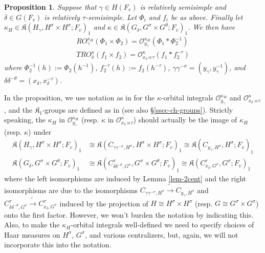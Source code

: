 \documentclass[12pt]{amsart}
\newtheorem{prop}[thm]{Proposition}
\theoremstyle{remark}
\numberwithin{equation}{section}
\newcommand{\OO}{\mathcal{O}}
\theoremstyle{definition}
\numberwithin{equation}{subsection}
\begin{document}
\begin{prop} \label{prop-E-split-match} Suppose that $\gamma \in H(F_v)$ is relatively semisimple and
$\delta \in G(F_v)$ is relatively $\tau$-semisimple.  Let $\Phi_i$ and $f_i$ be as above.  Finally
let $\kappa_H \in \mathfrak{K}(H_{\gamma},H^{\sigma} \times H^{\sigma};F_v)_1$ and $\kappa \in \mathfrak{K}(G_{\delta}, G^{\sigma} \times G^{\theta};F_v)_1$.  We then
have
\begin{align*}
RO^{\kappa_H}_{\gamma}(\Phi_1 \times \Phi_2)=\mathcal{O}^{\kappa_H}_{y_{\gamma}}(\Phi_1 * \Phi_2^{-1})\\
TRO^{\kappa}_{\delta}(f_1 \times f_2)=\mathcal{O}^{\kappa}_{x_{\delta} \rtimes \tau}(f_1 *f_2^{-\tau})
\end{align*}
where $\Phi_2^{-1}(h):=\Phi_2(h^{-1})$, $f_2^{-\tau}(h):=f_2(h^{-\tau})$, $\gamma\gamma^{-\sigma}=(y_{\gamma},y_{\gamma}^{-1})$, and $\delta\delta^{-\theta}=(x_{\delta},x_{\delta}^{-\tau})$.
\end{prop}
\noindent In the proposition, we use notation as in \cite[\S 1.5]{HarLab} for the $\kappa$-orbital integrals
$\OO^{\kappa_H}_{y_{\gamma}}$ and $\OO^{\kappa}_{x_{\delta} \rtimes \tau}$, and the $\mathfrak{K}_1$-groups are defined as in \cite[\S 1.8]{Lab} (see also \S \ref{ssec-ch-groups}).  Strictly speaking, the $\kappa_H$ in $\OO^{\kappa_H}_{y_{\gamma}}$ (resp. $\kappa$ in $\OO_{x_{\delta} \rtimes \tau}^{\kappa}$) should actually be the image of $\kappa_H$ (resp. $\kappa$) under
\begin{align} \label{kappamaps}
\mathfrak{K}(H_{\gamma},H^{\sigma} \times H^{\sigma};F_v)_1 &\cong \mathfrak{K}(C_{\gamma \gamma^{-\sigma},H^{\sigma}},H^{\sigma} \times H^{\sigma};F_v)_1 \cong
\mathfrak{K}(C_{y_{\gamma},H^{\sigma}},H^{\sigma};F_v)_1\\
\nonumber \mathfrak{K}(G_{\delta},G^{\sigma} \times G^{\theta};F_v)_1 &\cong \mathfrak{K}(C^{\tau}_{\delta \delta^{-\theta},G^{\sigma}},G^{\sigma} \times G^{\theta};F_v)_1 \cong
\mathfrak{K}(C^{\tau}_{x_{\delta},G^{\sigma}},G^{\sigma};F_v)_1
\end{align}
where the left isomorphisms are induced by Lemma \ref{lem-2cent} and the right isomorphisms are due to the isomorphisms $C_{\gamma \gamma^{-\sigma},H^{\sigma}} \tilde{\to}C_{y_{\gamma},H^{\sigma}}$ and
$C^{\tau}_{\delta \delta^{-\theta},G^{\sigma}}\tilde{\to}C^{\tau}_{x_{\delta},G^{\sigma}}$
induced by the projection of $H \cong H^{\sigma} \times H^{\sigma}$ (resp. $G \cong G^{\sigma} \times G^{\sigma}$) onto the first factor.  However, we won't burden the
notation by indicating this.  Also, to make the $\kappa_H$-orbital integrals well-defined we need to specify choices of Haar measures on $H^{\sigma}$, $G^{\sigma}$, and various centralizers, but, again, we will
not incorporate this into the notation.
\end{document}
